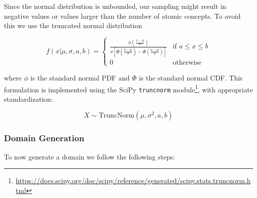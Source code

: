 Since the normal distribution is unbounded,
our sampling might result in negative values or values larger than the number of atomic concepts.
To avoid this we use the truncated normal distribution

\begin{equation*}
    f(x|\mu, \sigma, a, b) =
    \begin{cases}
        \frac{\phi\left(\frac{x-\mu}{\sigma}\right)}{\sigma\left[\Phi\left(\frac{b-\mu}{\sigma}\right) - \Phi\left(\frac{a-\mu}{\sigma}\right)\right]} & \text{if } a \leq x \leq b \\
        0                                                                                                                                              & \text{otherwise}
    \end{cases}
\end{equation*}

where $\phi$ is the standard normal \acrshort{PDF} and $\Phi$ is the standard normal \acrshort{CDF}.
This formulation is implemented using the SciPy \texttt{truncnorm} module\footnote{\url{https://docs.scipy.org/doc/scipy/reference/generated/scipy.stats.truncnorm.html}},
with appropriate standardization:

\begin{equation*}
    X \sim \text{TruncNorm}(\mu, \sigma^2, a, b)
\end{equation*}

\subsubsection{Domain Generation}

To now generate a domain we follow the following steps:

